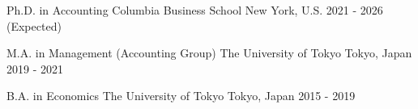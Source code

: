 

\begin{cventries}
    \cventry
    {Ph.D. in Accounting} %
    {Columbia Business School} %
    {New York, U.S.} %
    {2021 - 2026 (Expected)} %
    {}

    \cventry
    {M.A. in Management (Accounting Group)} %
    {The University of Tokyo} %
    {Tokyo, Japan} %
    {2019 - 2021} %
    {}

    \cventry
    {B.A. in Economics} %
    {The University of Tokyo} %
    {Tokyo, Japan} %
    {2015 - 2019} %
    {}

\end{cventries}
